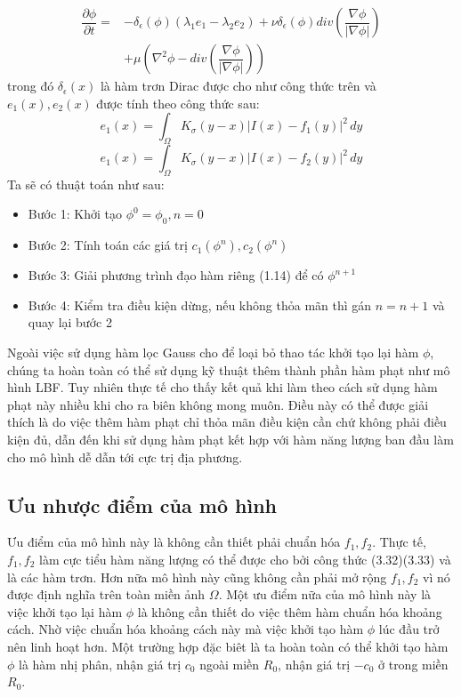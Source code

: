 \documentclass[14pt,oneside,a4paper]{extreport}
\begin{document}
\begin{equation*}
\begin{split}
\dfrac{\partial \phi}{\partial t}=&- \delta_{\epsilon}(\phi)(\lambda_1 e_1 -\lambda_2 e_2)+\nu \delta_{\epsilon}(\phi)div(\dfrac{\nabla \phi}{|\nabla \phi|})\\
&+\mu(\nabla^2 \phi -div(\dfrac{\nabla \phi}{|\nabla \phi|}))
\end{split}
\end{equation*} 
trong đó $\delta_{\epsilon}(x)$ là hàm trơn Dirac được cho như công thức trên và $e_1(x), e_2(x)$ được tính theo công thức sau:
\begin{equation*}
e_1(x)=\int_{\Omega}K_{\sigma}(y-x)|I(x)-f_1(y)|^2 \,dy
\end{equation*}
\begin{equation*}
e_1(x)=\int_{\Omega}K_{\sigma}(y-x)|I(x)-f_2(y)|^2 \,dy
\end{equation*}
Ta sẽ có thuật toán như sau:
\begin{itemize}
\item Bước 1: Khởi tạo $\phi^0=\phi_0, n=0$
\item Bước 2: Tính toán các giá trị $c_1(\phi^n), c_2(\phi^n)$
\item Bước 3: Giải phương trình đạo hàm riêng (1.14) để có $\phi^{n+1}$
\item Bước 4: Kiểm tra điều kiện dừng, nếu không thỏa mãn thì gán $n=n+1$ và quay lại bước 2
\end{itemize}
Ngoài việc sử dụng hàm lọc Gauss cho để loại bỏ thao tác khởi tạo lại hàm $\phi$, chúng ta hoàn toàn có thể sử dụng kỹ thuật thêm thành phần hàm phạt như mô hình LBF. Tuy nhiên thực tế cho thấy kết quả khi làm theo cách sử dụng hàm phạt này nhiều khi cho ra biên không mong muôn. Điều này có thể được giải thích là do việc thêm hàm phạt chỉ thỏa mãn điều kiện cần chứ không phải điều kiện đủ, dẫn đến khi sử dụng hàm phạt kết hợp với hàm năng lượng ban đầu làm cho mô hình dễ dẫn tới cực trị địa phương.
\subsection{Ưu nhược điểm của mô hình}
Ưu điểm của mô hình này là không cần thiết phải chuẩn hóa $f_1, f_2$. Thực tế, $f_1, f_2$ làm cực tiểu hàm năng lượng có thể được cho bởi công thức (3.32)(3.33) và là các hàm trơn. Hơn nữa mô hình này cũng không cần phải mở rộng $f_1, f_2$ vì nó được định nghĩa trên toàn miền ảnh $\Omega$. Một ưu điểm nữa của mô hình này là việc khởi tạo lại hàm $\phi$ là không cần thiết do việc thêm hàm chuẩn hóa khoảng cách. Nhờ việc chuẩn hóa khoảng cách này mà việc khởi tạo hàm $\phi$ lúc đầu trở nên linh hoạt hơn. Một trường hợp đặc biêt là ta hoàn toàn có thể khởi tạo hàm $\phi$ là hàm nhị phân, nhận giá trị $c_0$ ngoài miền $R_0$, nhận giá trị $-c_0$ ở trong miền $R_0$.
\end{document}
